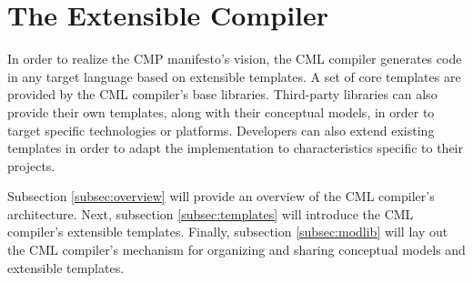 \section{The Extensible Compiler}\label{sec:compiler}

In order to realize the CMP \cite{cmp} manifesto's vision,
the CML compiler generates code in any target language based on extensible templates.
A set of core templates are provided by the CML compiler's base libraries.
Third-party libraries can also provide their own templates,
along with their conceptual models,
in order to target specific technologies or platforms.
Developers can also extend existing templates in order to adapt the implementation to characteristics specific to their projects.

Subsection \ref{subsec:overview} will provide an overview of the CML compiler's architecture.
Next, subsection \ref{subsec:templates} will introduce the CML compiler's extensible templates.
Finally, subsection \ref{subsec:modlib} will lay out the CML compiler's mechanism for organizing and sharing conceptual models and extensible templates.





